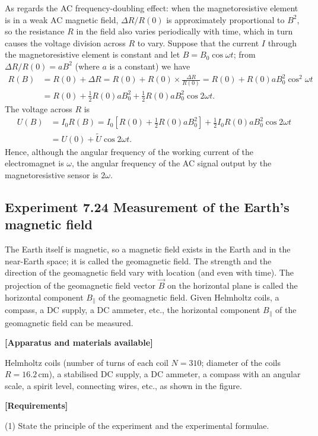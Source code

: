 As regards the AC frequency-doubling effect: when the magnetoresistive element is in a weak AC magnetic field, $\Delta R/R(0)$ is approximately proportional to $B^2$, so the resistance $R$ in the field also varies periodically with time, which in turn causes the voltage division across $R$ to vary. Suppose that the current $I$ through the magnetoresistive element is constant and let $B=B_0\cos\omega t$; from $\Delta R/R(0)=aB^2$ (where $a$ is a constant) we have
\[
\begin{aligned}
R(B)&=R(0)+\Delta R=R(0)+R(0)\times\frac{\Delta R}{R(0)}=R(0)+R(0)aB_0^2\cos^2\omega t\\
&=R(0)+\frac12R(0)aB_0^2+\frac12R(0)aB_0^2\cos2\omega t .
\end{aligned}
\]
The voltage across $R$ is
\[
\begin{aligned}
U(B)&=I_0R(B)=I_0\left[R(0)+\frac12R(0)aB_0^2\right]+\frac12I_0R(0)aB_0^2\cos2\omega t\\
&=U(0)+\tilde{U}\cos2\omega t .
\end{aligned}
\]
Hence, although the angular frequency of the working current of the electromagnet is $\omega$, the angular frequency of the AC signal output by the magnetoresistive sensor is $2\omega$.

\subsection*{Experiment 7.24 \quad Measurement of the Earth's magnetic field}

The Earth itself is magnetic, so a magnetic field exists in the Earth and in the near-Earth space; it is called the geomagnetic field. The strength and the direction of the geomagnetic field vary with location (and even with time). The projection of the geomagnetic field vector $\vec{B}$ on the horizontal plane is called the horizontal component $B_\parallel$ of the geomagnetic field. Given Helmholtz coils, a compass, a DC supply, a DC ammeter, etc., the horizontal component $B_\parallel$ of the geomagnetic field can be measured.

\textbf{[Apparatus and materials available]}

Helmholtz coils (number of turns of each coil $N=310$; diameter of the coils $R=16.2\,\mathrm{cm}$), a stabilised DC supply, a DC ammeter, a compass with an angular scale, a spirit level, connecting wires, etc., as shown in the figure.

\textbf{[Requirements]}

(1) State the principle of the experiment and the experimental formulae.


